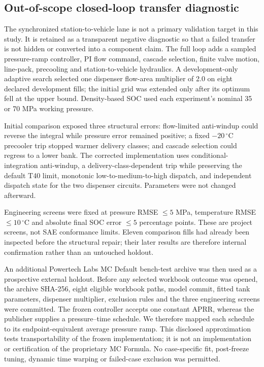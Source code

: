 \documentclass[12pt,a4paper]{article}
\begin{document}
\subsection{Out-of-scope closed-loop transfer diagnostic}
The synchronized station-to-vehicle lane is not a primary validation target in
this study. It is retained as a transparent negative diagnostic so that a failed
transfer is not hidden or converted into a component claim.
The full loop adds a sampled pressure-ramp controller, PI flow command, cascade
selection, finite valve motion, line-pack, precooling and station-to-vehicle
hydraulics. A
development-only adaptive search selected one dispenser flow-area multiplier of
2.0 on eight declared development fills; the initial grid was extended only after
its optimum fell at the upper bound. Density-based SOC used each experiment's
nominal 35 or 70 MPa working pressure.

Initial comparison exposed three structural errors: flow-limited anti-windup
could reverse the integral while pressure error remained positive; a fixed
$-20\,^{\circ}$C precooler trip stopped warmer delivery classes; and cascade
selection could regress to a lower bank. The corrected implementation uses
conditional-integration anti-windup, a delivery-class-dependent trip while
preserving the default T40 limit, monotonic low-to-medium-to-high dispatch, and
independent dispatch state for the two dispenser circuits. Parameters were not
changed afterward.

Engineering screens were fixed at pressure RMSE $\leq5$ MPa, temperature RMSE
$\leq10\,^{\circ}$C and absolute final SOC error $\leq5$ percentage points. These
are project screens, not SAE conformance limits. Eleven comparison fills had
already been inspected before the structural repair; their later results are
therefore internal confirmation rather than an untouched holdout.

An additional Powertech Labs MC Default bench-test archive was then used as a
prospective external holdout. Before any selected workbook outcome was opened,
the archive SHA-256, eight eligible workbook paths, model commit, fitted tank
parameters, dispenser multiplier, exclusion rules and the three engineering
screens were committed. The frozen controller accepts one constant APRR, whereas
the publisher supplies a pressure--time schedule. We therefore mapped each
schedule to its endpoint-equivalent average pressure ramp. This disclosed
approximation tests transportability of the frozen implementation; it is not an
implementation or certification of the proprietary MC Formula. No case-specific
fit, post-freeze tuning, dynamic time warping or failed-case exclusion was
permitted.
\end{document}
